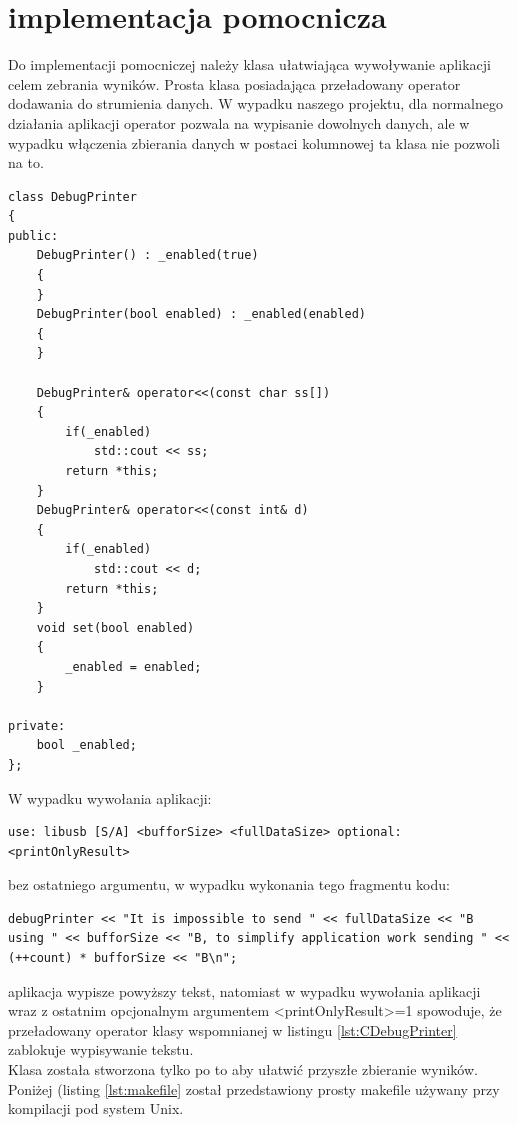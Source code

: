 \documentclass{BscUS}
\begin{document}
\section{implementacja pomocnicza}

Do implementacji pomocniczej należy klasa ułatwiająca wywoływanie aplikacji celem zebrania wyników. Prosta klasa posiadająca przeładowany operator dodawania do strumienia danych. W wypadku naszego projektu, dla normalnego działania aplikacji operator pozwala na wypisanie dowolnych danych, ale w wypadku włączenia zbierania danych w postaci kolumnowej ta klasa nie pozwoli na to.

\begin{lstlisting}[caption={Klasa DebugPrinter},label={lst:CDebugPrinter}]
class DebugPrinter
{
public:
	DebugPrinter() : _enabled(true)
	{
	}
	DebugPrinter(bool enabled) : _enabled(enabled)
	{
	}
	
	DebugPrinter& operator<<(const char ss[])
	{
		if(_enabled)
			std::cout << ss;
		return *this;
	}
	DebugPrinter& operator<<(const int& d)
	{
		if(_enabled)
			std::cout << d;
		return *this;
	}
	void set(bool enabled)
	{
		_enabled = enabled;
	}

private:
	bool _enabled;
};
\end{lstlisting}
W wypadku wywołania aplikacji:
\begin{lstlisting}[caption={Uruchomienie testu}]
use: libusb [S/A] <bufforSize> <fullDataSize> optional:<printOnlyResult>
\end{lstlisting}
bez ostatniego argumentu, w wypadku wykonania tego fragmentu kodu: 
\begin{lstlisting}[caption={Wypisywanie w zależności od argumentu wywołania aplikacji}]
debugPrinter << "It is impossible to send " << fullDataSize << "B using " << bufforSize << "B, to simplify application work sending " << (++count) * bufforSize << "B\n";
\end{lstlisting}
aplikacja wypisze powyższy tekst, natomiast w wypadku wywołania aplikacji wraz z ostatnim opcjonalnym argumentem <printOnlyResult>=1 spowoduje, że przeładowany operator klasy wspomnianej w listingu \ref{lst:CDebugPrinter} zablokuje wypisywanie tekstu. \\
Klasa została stworzona tylko po to aby ułatwić przyszłe zbieranie wyników.
\newline
\newline
Poniżej (listing \ref{lst:makefile} został przedstawiony prosty makefile używany przy kompilacji pod system Unix.
\end{document}
